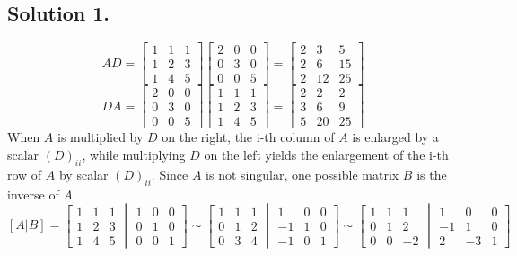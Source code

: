 \documentclass{article}
\begin{document}
\subsection*{Solution 1.}
\[AD=\left[\begin{array}{ccc}1&1&1\\1&2&3\\1&4&5\end{array}\right]\left[\begin{array}{ccc}2&0&0\\0&3&0\\0&0&5\end{array}\right]=\left[\begin{array}{ccc}2&3&5\\2&6&15\\2&12&25\end{array}\right]\]
\[DA=\left[\begin{array}{ccc}2&0&0\\0&3&0\\0&0&5\end{array}\right]\left[\begin{array}{ccc}1&1&1\\1&2&3\\1&4&5\end{array}\right]=\left[\begin{array}{ccc}2&2&2\\3&6&9\\5&20&25\end{array}\right]\]
When $A$ is multiplied by $D$ on the right, the i-th column of $A$ is enlarged by a scalar $(D)_{ii}$, while multiplying $D$ on the left yields the enlargement of the i-th row of $A$ by scalar $(D)_{ii}$.\newline
Since $A$ is not singular, one possible matrix $B$ is the inverse of $A$.
\[[A|B]=\left[\begin{array}{ccc}1&1&1\\1&2&3\\1&4&5\end{array}\middle\vert\begin{array}{ccc}1&0&0\\0&1&0\\0&0&1\end{array}\right]
\sim\left[\begin{array}{ccc}1&1&1\\0&1&2\\0&3&4\end{array}\middle\vert\begin{array}{ccc}1&0&0\\-1&1&0\\-1&0&1\end{array}\right]
\sim\left[\begin{array}{ccc}1&1&1\\0&1&2\\0&0&-2\end{array}\middle\vert\begin{array}{ccc}1&0&0\\-1&1&0\\2&-3&1\end{array}\right]\]
\end{document}
